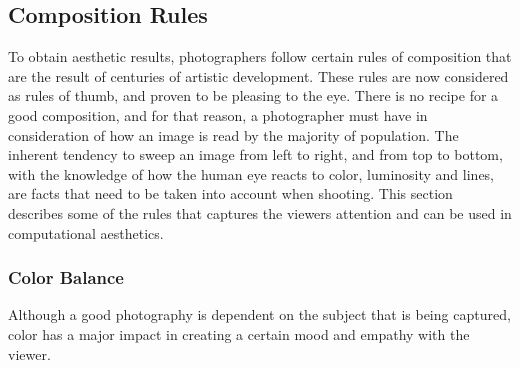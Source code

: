 
\subsection{Composition Rules}
\label{sub:photo_rules}

To obtain aesthetic results, photographers follow certain rules of composition that are the result of centuries of artistic development. These rules are now considered as rules of thumb, and proven to be pleasing to the eye.
There is no recipe for a good composition, and for that reason, a photographer must have in consideration of how an image is read by the majority of population. The inherent tendency to sweep an image from left to right, and from top to bottom, with the knowledge of how the human eye reacts to color, luminosity and  lines, are facts that need to be taken into account when shooting. This section describes some of the rules that captures the viewers attention and can be used in computational aesthetics.

\subsubsection{Color Balance}
\label{subsub:color_balance}

Although a good photography is dependent on the subject that is being captured, color has a major impact in creating a certain mood and empathy with the viewer. 

